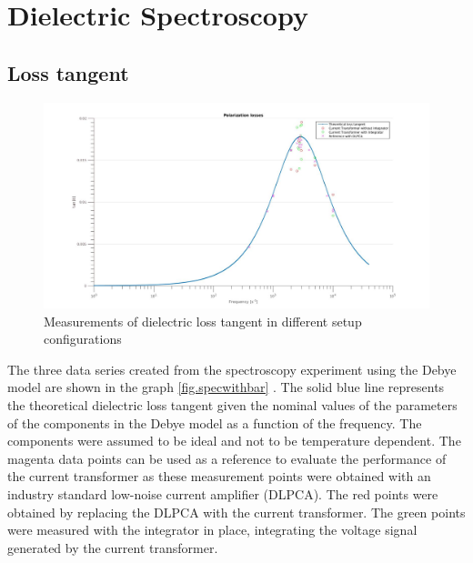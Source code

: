 \section{Dielectric Spectroscopy}
\subsection{Loss tangent}
\begin{figure}[htbp]
  \centering
  \centerline{\includegraphics[width=\textwidth]{figures/Results/Spectroscopy/spectroscopywithoutbars}}
  \caption[Kurze Abbildungsbeschreibung]{Measurements of dielectric loss tangent in different setup configurations}
\label{fig.specwithbar}
  \label{fig.spectroscopy}

\end{figure}
The three data series created from the spectroscopy experiment using the Debye model are shown in the graph \ref{fig.specwithbar} . The solid blue line represents the theoretical  dielectric loss tangent given the nominal values of the parameters of the components in the Debye model
as a function of the frequency.
The components were assumed to be ideal and not to be temperature dependent.
The magenta data points can be used as a reference to evaluate the performance of the current transformer as these measurement points
were obtained with an industry standard low-noise current amplifier (DLPCA). 
The red points were obtained by replacing the DLPCA with the current transformer.
The green points were measured with the integrator in place, integrating the voltage signal generated by the current transformer.

